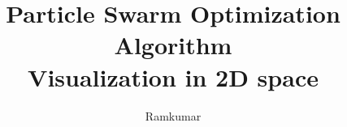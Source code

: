 \documentclass{beamer}
\title{Particle Swarm Optimization Algorithm \\ Visualization in 2D space}
\author{Ramkumar}
\begin{document}
\frame{\maketitle}


\end{document}
